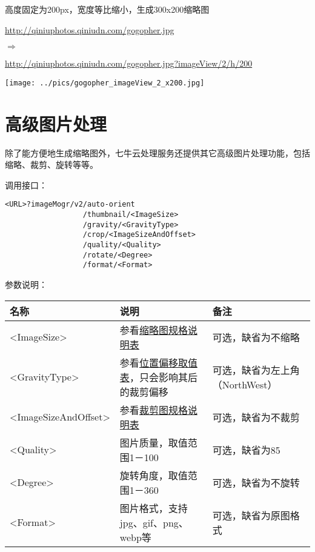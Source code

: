 \documentclass[11pt, oneside]{book}
\newcommand{\qpar}[1]{
\vspace{0.25em}
\noindent
#1\par
\vspace{0.25em}
}
\newcommand{\qurl}[1]{\url{#1}}
\newcommand{\qtable}[1]{\footnotesize\vspace{0.5em}#1\vspace{0.5em}\normalsize}
\begin{document}
\begin{CJK*}{UTF8}{song}
\begin{sample}
  \caption{高度固定为200px，宽度等比缩小，生成300x200缩略图}
    \qpar{\qurl{http://qiniuphotos.qiniudn.com/gogopher.jpg}}
    \qpar{$\Rightarrow$}
    \qpar{\qurl{http://qiniuphotos.qiniudn.com/gogopher.jpg?imageView/2/h/200}}

    \begin{center}
      \texttt{[image: ../pics/gogopher\_imageView\_2\_x200.jpg]}
    \end{center}
  \label{imageView-2-x200}
\end{sample}

\clearpage

\section{高级图片处理}

\qpar{除了能方便地生成缩略图外，七牛云处理服务还提供其它高级图片处理功能，包括缩略、裁剪、旋转等等。}
\qpar{调用接口：}
\begin{lstlisting}[basicstyle=\ttfamily\footnotesize]
<URL>?imageMogr/v2/auto-orient
                  /thumbnail/<ImageSize>
                  /gravity/<GravityType>
                  /crop/<ImageSizeAndOffset>
                  /quality/<Quality>
                  /rotate/<Degree>
                  /format/<Format>
\end{lstlisting}

\qpar{参数说明：}
\qtable{
\def\arraystretch{2}
\begin{tabular}{|l|p{18em}|p{10em}|}
\hline
名称 & 说明 & 备注\\
\hline
\textless ImageSize\textgreater & 参看\hyperref[thumbnail-spec]{缩略图规格说明表} & 可选，缺省为不缩略 \\
\hline
\textless GravityType\textgreater & 参看\hyperref[offset-spec]{位置偏移取值表}，只会影响其后的裁剪偏移 & 可选，缺省为左上角（NorthWest） \\
\hline
\textless ImageSizeAndOffset\textgreater & 参看\hyperref[crop-spec]{裁剪图规格说明表} & 可选，缺省为不裁剪 \\
\hline
\textless Quality\textgreater & 图片质量，取值范围1－100 & 可选，缺省为85 \\
\hline
\textless Degree\textgreater & 旋转角度，取值范围1－360 & 可选，缺省为不旋转 \\
\hline
\textless Format\textgreater & 图片格式，支持jpg、gif、png、webp等 & 可选，缺省为原图格式 \\
\hline
\end{tabular}
}


\end{CJK*}
\end{document}
